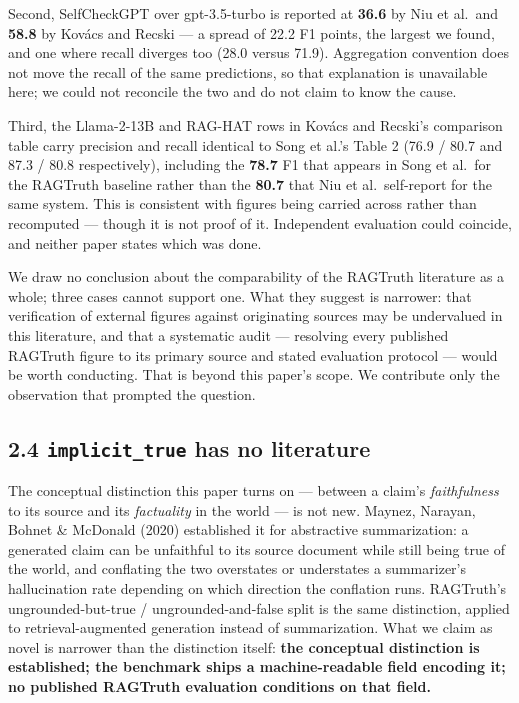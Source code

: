 \documentclass[11pt]{article}
\begin{document}
Second, SelfCheckGPT over gpt-3.5-turbo is reported at \textbf{36.6} by Niu et al.~and \textbf{58.8}
by Kovács and Recski --- a spread of 22.2 F1 points, the largest we found, and one where
recall diverges too (28.0 versus 71.9). Aggregation convention does not move the recall of
the same predictions, so that explanation is unavailable here; we could not reconcile the
two and do not claim to know the cause.

Third, the Llama-2-13B and RAG-HAT rows in Kovács and Recski's comparison table carry
precision and recall identical to Song et al.'s Table 2 (76.9 / 80.7 and 87.3 / 80.8
respectively), including the \textbf{78.7} F1 that appears in Song et al.~for the RAGTruth
baseline rather than the \textbf{80.7} that Niu et al.~self-report for the same system. This is
consistent with figures being carried across rather than recomputed --- though it is not
proof of it. Independent evaluation could coincide, and neither paper states which was
done.

We draw no conclusion about the comparability of the RAGTruth literature as a whole; three
cases cannot support one. What they suggest is narrower: that verification of external
figures against originating sources may be undervalued in this literature, and that a
systematic audit --- resolving every published RAGTruth figure to its primary source and
stated evaluation protocol --- would be worth conducting. That is beyond this paper's scope.
We contribute only the observation that prompted the question.

\subsection{\texorpdfstring{2.4 \texttt{implicit\_true} has no literature}{2.4 implicit\_true has no literature}}\label{implicit_true-has-no-literature}

The conceptual distinction this paper turns on --- between a claim's \emph{faithfulness} to its
source and its \emph{factuality} in the world --- is not new. Maynez, Narayan, Bohnet \& McDonald
(2020) established it for abstractive summarization: a generated claim can be unfaithful to
its source document while still being true of the world, and conflating the two
overstates or understates a summarizer's hallucination rate depending on which direction
the conflation runs. RAGTruth's ungrounded-but-true / ungrounded-and-false split is the same
distinction, applied to retrieval-augmented generation instead of summarization. What we
claim as novel is narrower than the distinction itself: \textbf{the conceptual distinction is
established; the benchmark ships a machine-readable field encoding it; no published
RAGTruth evaluation conditions on that field.}
\end{document}
